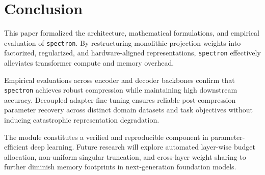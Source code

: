 \section{Conclusion}
This paper formalized the architecture, mathematical formulations, and empirical evaluation of \texttt{spectron}. By restructuring monolithic projection weights into factorized, regularized, and hardware-aligned representations, \texttt{spectron} effectively alleviates transformer compute and memory overhead.

Empirical evaluations across encoder and decoder backbones confirm that \texttt{spectron} achieves robust compression while maintaining high downstream accuracy. Decoupled adapter fine-tuning ensures reliable post-compression parameter recovery across distinct domain datasets and task objectives without inducing catastrophic representation degradation.

The module constitutes a verified and reproducible component in parameter-efficient deep learning. Future research will explore automated layer-wise budget allocation, non-uniform singular truncation, and cross-layer weight sharing to further diminish memory footprints in next-generation foundation models.
